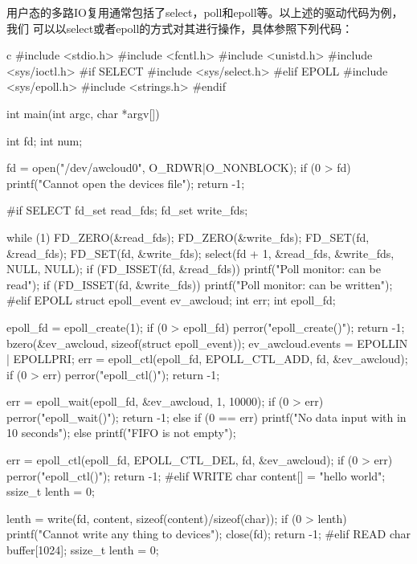 用户态的多路IO复用通常包括了select，poll和epoll等。以上述的驱动代码为例，我们
可以以select或者epoll的方式对其进行操作，具体参照下列代码：
\begin{code-block}{c}
#include <stdio.h>
#include <fcntl.h>
#include <unistd.h>
#include <sys/ioctl.h>
#if SELECT
#include <sys/select.h>
#elif EPOLL
#include <sys/epoll.h>
#include <strings.h>
#endif

int main(int argc, char *argv[])
{
        int fd;
        int num;

        fd = open("/dev/awcloud0", O_RDWR|O_NONBLOCK);
        if (0 > fd) {
                printf("Cannot open the devices file\n");
                return -1;
        }

#if SELECT
        fd_set read_fds;
        fd_set write_fds;

        while (1) {
                FD_ZERO(&read_fds);
                FD_ZERO(&write_fds);
                FD_SET(fd, &read_fds);
                FD_SET(fd, &write_fds);
                select(fd + 1, &read_fds, &write_fds, NULL, NULL);
                if (FD_ISSET(fd, &read_fds)) {
                        printf("Poll monitor: can be read\n");
                }
                if (FD_ISSET(fd, &write_fds)) {
                        printf("Poll monitor: can be written\n");
                }
        }
#elif EPOLL
        struct epoll_event ev_awcloud;
        int err;
        int epoll_fd;

        epoll_fd = epoll_create(1);
        if (0 > epoll_fd) {
                perror("epoll_create()");
                return -1;
        }
        bzero(&ev_awcloud, sizeof(struct epoll_event));
        ev_awcloud.events = EPOLLIN | EPOLLPRI;
        err = epoll_ctl(epoll_fd, EPOLL_CTL_ADD, fd, &ev_awcloud);
        if (0 > err) {
                perror("epoll_ctl()");
                return -1;
        }

        err = epoll_wait(epoll_fd, &ev_awcloud, 1, 10000);
        if (0 > err) {
                perror("epoll_wait()");
                return -1;
        } else if (0 == err) {
                printf("No data input with in 10 seconds\n");
        } else {
                printf("FIFO is not empty\n");
        }

        err = epoll_ctl(epoll_fd, EPOLL_CTL_DEL, fd, &ev_awcloud);
        if (0 > err) {
                perror("epoll_ctl()");
                return -1;
        }
#elif WRITE
        char content[] = "hello world";
        ssize_t lenth = 0;

        lenth = write(fd, content, sizeof(content)/sizeof(char));
        if (0 > lenth) {
                printf("Cannot write any thing to devices\n");
                close(fd);
                return -1;
        }
#elif READ
        char buffer[1024];
        ssize_t lenth = 0;

}
\end{code-block}

